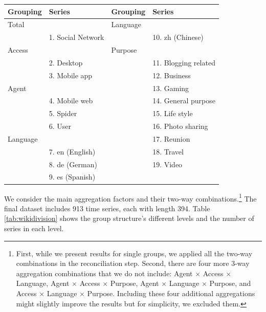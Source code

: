 \documentclass[11pt,a4paper,]{article}
\let\origtable\table
\let\endorigtable\endtable
\renewenvironment{table}[1][2] {
    \expandafter\origtable\expandafter[!htbp]
} {
    \endorigtable
}
\begin{document}
\begin{table}

\caption{\label{tab:wikipediagroupingstructure}Social networking Wikipedia article grouping structure}
\centering
\begin{tabular}[t]{llll}
\toprule
Grouping & Series & Grouping & Series\\
\midrule
Total &  & Language & \\
 & 1. Social Network &  & 10. zh (Chinese)\\
Access &  & Purpose & \\
 & 2. Desktop &  & 11. Blogging related\\
 & 3. Mobile app &  & 12. Business\\
Agent &  &  & 13. Gaming\\
 & 4.  Mobile web &  & 14. General purpose\\
 & 5. Spider &  & 15. Life style\\
 & 6. User &  & 16. Photo sharing\\
Language &  &  & 17. Reunion\\
 & 7. en (English) &  & 18. Travel\\
 & 8. de (German) &  & 19. Video\\
 & 9. es (Spanish) &  & \\
\bottomrule
\end{tabular}
\end{table}

We consider the main aggregation factors and their two-way combinations.\footnote{First, while we present results for single groups, we applied all the two-way combinations in the reconciliation step. Second, there are four more 3-way aggregation combinations that we do not include: Agent \(\times\) Access \(\times\) Language, Agent \(\times\) Access \(\times\) Purpose, Agent \(\times\) Language \(\times\) Purpose, and Access \(\times\) Language \(\times\) Purpose. Including these four additional aggregations might slightly improve the results but for simplicity, we excluded them.} The final dataset includes 913 time series, each with length 394. Table \ref{tab:wikidivision} shows the group structure's different levels and the number of series in each level.
\end{document}
